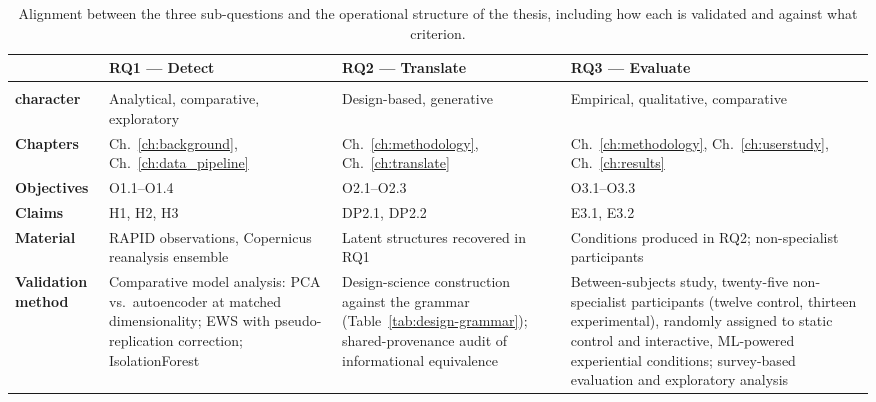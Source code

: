 \begin{table}[!ht]
    \centering
    \small
    \setlength{\tabcolsep}{5pt}
    \renewcommand{\arraystretch}{1.25}
    \caption{Alignment between the three sub-questions and the operational structure of the thesis, including how each is validated and against what criterion.}
    \label{tab:alignment}
    \begin{tabular}{
        @{}
        >{\RaggedRight\arraybackslash}p{2.7cm}
        >{\RaggedRight\arraybackslash}p{3.7cm}
        >{\RaggedRight\arraybackslash}p{3.7cm}
        >{\RaggedRight\arraybackslash}p{3.7cm}
        @{}
    }
        \toprule
        & \textbf{RQ1 --- Detect}
        & \textbf{RQ2 --- Translate}
        & \textbf{RQ3 --- Evaluate} \\
        \midrule
        \makecell[l]{\textbf{Epistemic}\\\textbf{character}}
            & Analytical, comparative, exploratory
            & Design-based, generative
            & Empirical, qualitative, comparative \\[0.5em]

        \textbf{Chapters}
            & Ch.~\ref{ch:background}, Ch.~\ref{ch:data_pipeline}
            & Ch.~\ref{ch:methodology}, Ch.~\ref{ch:translate}
            & Ch.~\ref{ch:methodology}, Ch.~\ref{ch:userstudy}, Ch.~\ref{ch:results} \\[0.5em]

        \textbf{Objectives}
            & O1.1--O1.4
            & O2.1--O2.3
            & O3.1--O3.3 \\[0.5em]

        \textbf{Claims}
            & H1, H2, H3
            & DP2.1, DP2.2
            & E3.1, E3.2 \\[0.5em]

        \textbf{Material}
            & RAPID observations, Copernicus reanalysis ensemble
            & Latent structures recovered in RQ1
            & Conditions produced in RQ2; non-specialist participants \\[0.5em]

        \textbf{Validation method}
            & Comparative model analysis: PCA vs.\ autoencoder at matched dimensionality; EWS with pseudo-replication correction; IsolationForest
            & Design-science construction against the grammar (Table~\ref{tab:design-grammar}); shared-provenance audit of informational equivalence
            & Between-subjects study, twenty-five non-specialist participants (twelve control, thirteen experimental), randomly assigned to static control and interactive, ML-powered experiential conditions; survey-based evaluation and exploratory analysis \\[0.5em]


\end{tabular}
\end{table}

